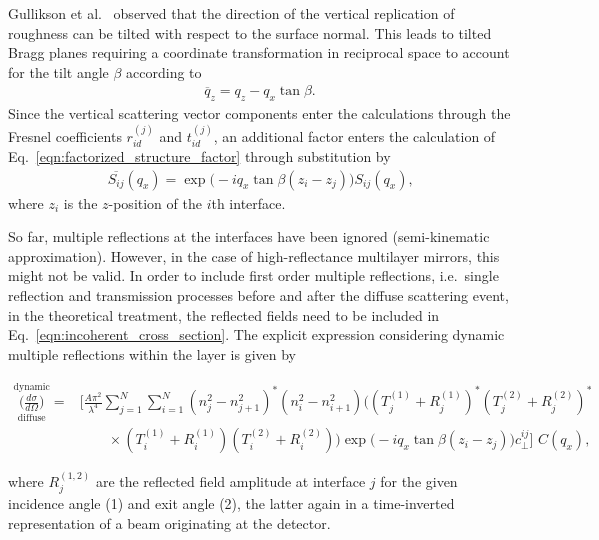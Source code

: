 \documentclass[twocolumn,osajnl,showpacs,superscriptaddress,11pt]{revtex4-1}
\begin{document}
Gullikson et al.~\cite{PhysRevB.59.13273} observed that the direction of the vertical replication of roughness can be tilted with respect to the surface normal. This leads to tilted Bragg planes requiring a coordinate transformation in reciprocal space to account for the tilt angle $\beta$ according to
\begin{align}
\overline{q}_z = q_z - q_x \tan \beta\text{.}
\end{align}
Since the vertical scattering vector components enter the calculations through the Fresnel coefficients $r_{id}^{(j)}$ and $t_{id}^{(j)}$, an additional factor enters the calculation of Eq.~\eqref{eqn:factorized_structure_factor} through substitution by
\begin{align}
\overline{S_{ij}}(q_x) = \exp\Big(-i q_x \tan \beta (z_i-z_j)\Big)  S_{ij}(q_x) \text{,} \label{eqn:tilt_correction}
\end{align}
where $z_i$ is the $z$-position of the $i$th interface.

So far, multiple reflections at the interfaces have been ignored (semi-kinematic approximation). However, in the case of high-reflectance multilayer mirrors, this might not be valid. In order to include first order multiple reflections, i.e.~single reflection and transmission processes before and after the diffuse scattering event, in the theoretical treatment, the reflected fields need to be included in Eq.~\eqref{eqn:incoherent_cross_section}. The explicit expression considering dynamic multiple reflections within the layer is given by
\begin{widetext}
    \begin{align}
        \overset{\text{dynamic}}{\underset{\text{diffuse}}{\Big(\frac{d \sigma}{d \Omega}\Big)}} = &\Bigg[\frac{A \pi^2}{\lambda^4}\sum \limits_{j=1}^{N}\sum \limits_{i=1}^{N} (n_j^2 - n_{j+1}^2)^* (n_i^2 - n_{i+1}^2)\Big( (T^{(1)}_j + R^{(1)}_j)^* (T^{(2)}_j + R^{(2)}_j)^* \nonumber \\ &\qquad\times(T^{(1)}_i + R^{(1)}_i) (T^{(2)}_i + R^{(2)}_i) \Big) \exp\Big(-i q_x \tan \beta (z_i-z_j)\Big) c_\perp^{i j}\Bigg]\,\, C(q_x) \text{,} \label{eqn:multilayer_enhancement_factor}
    \end{align}
\end{widetext}
where $R^{(1,2)}_j$ are the reflected field amplitude at interface $j$ for the given incidence angle (1) and exit angle (2), the latter again in a time-inverted representation of a beam originating at the detector.
\end{document}
